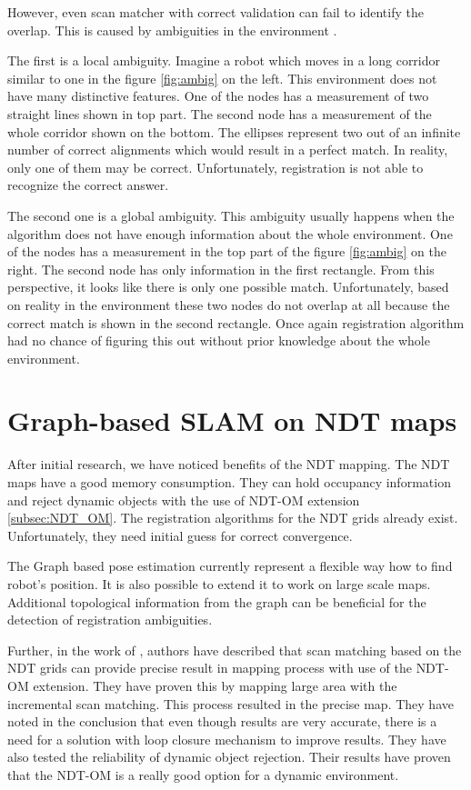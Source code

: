 However, even scan matcher with correct validation can fail to identify the overlap. This is caused by ambiguities in the environment \cite{Olson2009Loop}.

The first is a local ambiguity.  Imagine a robot which moves in a long corridor similar to one in the figure \ref{fig:ambig} on the left. This environment does not have many distinctive features. One of the nodes has a measurement of two straight lines shown in top part. The second node has a measurement of the whole corridor shown on the bottom. The ellipses represent two out of an infinite number of correct alignments which would result in a perfect match. In reality, only one of them may be correct. Unfortunately, registration is not able to recognize the correct answer.

The second one is a global ambiguity. This ambiguity usually happens when the algorithm does not have enough information about the whole environment. One of the nodes has a measurement in the top part of the figure \ref{fig:ambig} on the right.  The second node has only information in the first rectangle. From this perspective, it looks like there is only one possible match. Unfortunately,  based on reality in the environment these two nodes do not overlap at all because the correct match is shown in the second rectangle.   Once again registration algorithm had no chance of figuring this out without prior knowledge about the whole environment.




  
\section {Graph-based SLAM on NDT maps}


After initial research, we have noticed benefits of the \gls{NDT} mapping. The \gls{NDT} maps have a good memory consumption. They can hold occupancy information and reject dynamic objects with the use of \gls{NDT-OM} extension \ref{subsec:NDT_OM}. The registration algorithms for the \gls{NDT} grids already exist. Unfortunately, they need initial guess for correct convergence. 

The Graph based pose estimation currently represent a flexible way how to find robot's position. It is also possible to extend it to work on large scale maps. Additional topological information from the graph can be beneficial for the detection of registration ambiguities.

Further, in the work of \cite{NDTOMFusion}, authors have described that scan matching based on the \gls{NDT} grids can provide precise result in mapping process with use of the \gls{NDT-OM} extension. They have proven this by mapping large area with the incremental scan matching. This process resulted in the precise map. They have noted in the conclusion that even though results are very accurate, there is a need for a solution with loop closure mechanism to improve results. They have also tested the reliability of dynamic object rejection. Their results have proven that the \gls{NDT-OM} is a really good option for a dynamic environment.

